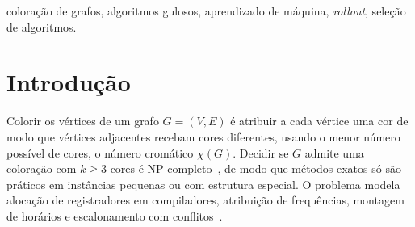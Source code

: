 \documentclass[conference,a4paper]{IEEEtran}
\begin{document}
{\renewcommand{\abstractname}{Abstract}
\begin{abstract}
Greedy vertex-colouring algorithms colour one vertex at a time with the smallest available
colour, and the number of colours depends on the rule that picks the next vertex. We study
whether a machine-learning model can learn this choice step by step. We implement random
order, Welsh-Powell, DSATUR and RLF as choice rules over a common partial state and build a
reproducible dataset of 2,818 Erdős–Rényi and Barabási–Albert graphs with 858,790
rollout-labelled candidates; the induced oracle colouring provably never uses more colours
than the best of DSATUR and RLF and uses fewer in 55\% of the labelled graphs. A gradient
boosting classifier picks an optimal candidate in 97.2\% of the decisive validation steps
(RLF's suggestion: 89.3\%), but end to end it ties the best heuristic in 96\% of the graphs: it
learns to follow RLF or DSATUR depending on the graph family, and its few per-step errors
accumulate. In the single final test on 127 DIMACS instances, the policy ties the best
heuristic on 90\% of them, improving on one and losing on 9\%, whereas the oracle beats the
best heuristic on 24\% of the instances with up to 500 vertices. Model improvements are left
to the second semester of the project.
\end{abstract}}

\begin{IEEEkeywords}
coloração de grafos, algoritmos gulosos, aprendizado de máquina, \emph{rollout}, seleção de
algoritmos.
\end{IEEEkeywords}

\section{Introdução}\label{sec:intro}

Colorir os vértices de um grafo $G=(V,E)$ é atribuir a cada vértice uma cor de modo que
vértices adjacentes recebam cores diferentes, usando o menor número possível de cores, o
número cromático $\chi(G)$. Decidir se $G$ admite uma coloração com $k \ge 3$ cores é
NP-completo~\cite{karp1972,garey1979}, de modo que métodos exatos só são práticos em
instâncias pequenas ou com estrutura especial. O problema modela alocação de registradores
em compiladores, atribuição de frequências, montagem de horários e escalonamento com
conflitos~\cite{lewis2021,malaguti2010}.
\end{document}
